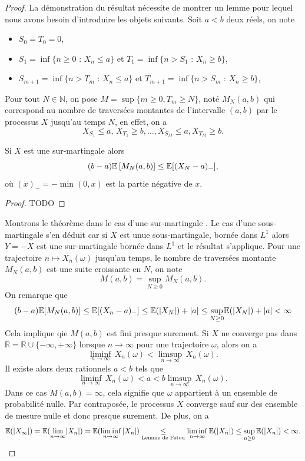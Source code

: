 \begin{proof}
La démonstration du résultat nécessite de montrer un lemme pour lequel nous avons besoin d'introduire les objets suivants. Soit $a<b$ deux réels, on note 
\begin{itemize}
    \item $S_0 = T_0 = 0$,
    \item $S_1 = \inf\{n\geq 0\text{ : }X_n\leq a\}$ et $T_1 = \inf\{n> S_1\text{ : }X_n\geq b\}$,
    \item $S_{m+1} = \inf\{n> T_m\text{ : }X_n\leq a\}$ et $T_{m+1} = \inf\{n> S_m\text{ : }X_n\geq b\}$,
\end{itemize}
Pour tout $N\in \mathbb{N}$, on pose $M  = \sup\{m\geq 0, T_m \geq N\}$, noté $M_{N}(a,b)$ qui correspond au nombre de traversées montantes de l'intervalle $(a,b)$ par le processus $X$ jusqu'au temps $N$, en effet, on a 
$$
X_{S_{1}}\leq a,\,X_{T_{1}}\geq b,\ldots, X_{S_{M}}\leq a,  X_{T_{M}}\geq b.
$$

\begin{lemma}
Si $X$ est une sur-martingale alors 
$$
(b-a)\mathbb{E}\left[M_N(a,b)\right]\leq \mathbb{E}[(X_N-a)_
{-}],
$$
où $(x)_{-} = -\min(0,x)$ est la partie négative de $x$.

\end{lemma}
\begin{proof}
TODO
\end{proof}
Montrons le théorème dans le cas d'une sur-martingale . Le cas d'une sous-martingale s'en déduit car si $X$ est unue sous-martingale, bornée dans $L^1$ alors $Y  = -X$ est une sur-martingale bornée dans $L^1$ et le résultat s'applique. Pour une trajectoire $n\mapsto X_n(\omega)$ jusqu'au temps, le nombre de traversées montante $M_N(a,b)$ est une suite croissante en $N$, on note 
$$
M(a,b) = \underset{N\geq 0}{\sup} M_N(a,b).
$$ 
On remarque que 
$$
(b-a)\mathbb{E}[M_N(a,b)]\leq \mathbb{E}[(X_n-a)_{-}]\leq\mathbb{E}(|X_N|) + |a|\leq  \underset{N\geq 0}{\sup}\mathbb{E}(|X_N|) + |a|<\infty
$$
Cela implique qie $M(a,b)$ est fini presque surement. Si $X$ ne converge pas dans $\overline{\mathbb{R}} = \mathbb{R}\cup \{-\infty, +\infty\}$ lorsque $n\rightarrow\infty$ pour une trajectoire $\omega$, alors on a 
$$
\underset{n\rightarrow \infty}{\liminf}\, X_n(\omega) < \underset{n\rightarrow \infty}{\limsup}\, X_n(\omega). 
$$
Il existe alors deux rationnels $a<b$ tels que 
$$
\underset{n\rightarrow \infty}{\liminf}\, X_n(\omega) < a < b \underset{n\rightarrow \infty}{\limsup}\, X_n(\omega). 
$$
Dans ce cas $M(a,b) = \infty$, cela signifie que $\omega$ appartient à un ensemble de probabilité nulle. Par contraposée, le processus $X$ converge sauf sur des ensemble de mesure nulle et donc presque surement. De plus, on a 
$$
\mathbb{E}(|X_\infty|) = \mathbb{E}(\underset{n\rightarrow\infty}{\lim} |X_n|) = \mathbb{E}(\underset{n\rightarrow\infty}{\liminf} \,|X_n|)\underset{\text{Lemme de Fatou}}{\leq} \underset{n\rightarrow\infty}{\liminf}\,\mathbb{E}( |X_n|)\leq \underset{n\geq 0}{\sup}\,\mathbb{E}(|X_n|)< \infty.
$$

\end{proof}
